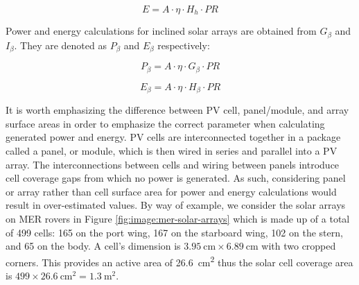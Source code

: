 \begin{equation}
  \label{eq:SA_energy}
  E = A \cdot \eta \cdot H_{h} \cdot PR
\end{equation}

Power and energy calculations for inclined solar arrays are obtained from $G_{\beta}$ and $I_{\beta}$. They are denoted as $P_{\beta}$ and $E_{\beta}$ respectively:

\begin{equation}
  \label{eq:SA_slope_power}
  P_{\beta} = A \cdot \eta \cdot G_{\beta} \cdot PR
\end{equation}


\begin{equation}
  \label{eq:SA_slope_energy}
  E_{\beta} = A \cdot \eta \cdot H_{\beta} \cdot PR
\end{equation}

It is worth emphasizing the difference between \ac{PV} cell, panel/module, and array surface areas in order to emphasize the correct parameter when calculating generated power and energy. \ac{PV} cells are interconnected together in a package called a panel, or module, which is then wired in series and parallel into a PV array. The interconnections between cells and wiring between panels introduce cell coverage gaps from which no power is generated. As such, considering panel or array rather than cell surface area for power and energy calculations would result in over-estimated values. By way of example, we consider the solar arrays on MER rovers in Figure \ref{fig:image:mer-solar-arrays} which is made up of a total of 499 cells: 165 on the port wing, 167 on the starboard wing, 102 on the stern, and 65 on the body. A cell's dimension is $\SI{3.95}{\centi\meter} \times \SI{6.89}{\centi\meter}$ with two cropped corners. This provides an active area of \SI{26.6}{\centi\meter\squared} thus the solar cell coverage area is $499 \times \SI{26.6}{\centi\meter\squared} = \SI{1.3}{\meter\squared}$.


